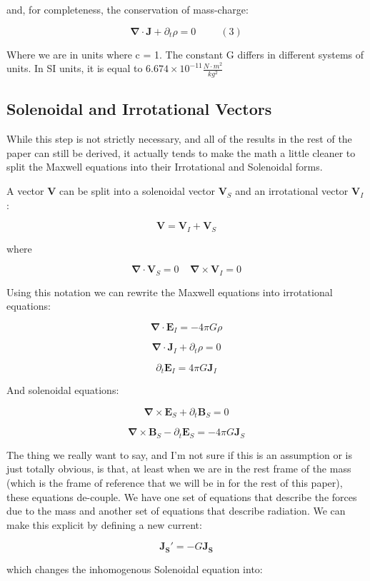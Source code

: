 \documentclass {article}
\renewcommand\vec{\mathbf}
\let\OldS\nabla
\renewcommand{\nabla}{\boldsymbol{\OldS}}
\begin{document}
and, for completeness, the conservation of mass-charge:

$$\nabla \cdot \vec J + \partial_t \rho = 0 ~~~~~~~~~~~ (3)$$

Where we are in units where c = 1. The constant G differs in different systems of units. In SI units, it is equal to $6.674 \times 10^{-11} \frac {N \cdot m^2}{kg^2}$ 

\newpage 
\subsection{Solenoidal and Irrotational Vectors}
While this step is not strictly necessary, and all of the results in the rest of the paper can still be derived, it actually tends to make the math a little cleaner to split the Maxwell equations into their Irrotational and Solenoidal forms.

A vector $\vec V$ can be split into a solenoidal vector $\vec V_S$ and an irrotational vector $\vec V_I$:

$$\vec V = \vec V_I + \vec V_S $$

where

$$\nabla \cdot \vec V_S = 0 ~~~~~ \nabla \times \vec V_I = 0 $$

Using this notation we can rewrite the Maxwell equations into irrotational equations:

$$\nabla \cdot \vec E_I = -4 \pi G  \rho$$

$$\nabla \cdot \vec J_I + \partial_t \rho = 0 $$

$$ \partial_t \vec E_I = 4 \pi G \vec J_I $$

And solenoidal equations:

$$\nabla \times \vec E_S + \partial_t \vec B_S = 0 $$

$$\nabla \times \vec B_S - \partial_t \vec E_S =  - 4 \pi G \vec J_S$$

The thing we really want to say, and I'm not sure if this is an assumption or is just totally obvious, is that, at least when we are in the rest frame of the mass (which is the frame of reference that we will be in for the rest of this paper), these equations de-couple. We have one set of equations that describe the forces due to the mass and another set of equations that describe radiation. We can make this explicit by defining a new current:

$$\vec {J_S'} = - G \vec {J_S}$$

which changes the inhomogenous Solenoidal equation into:
\end{document}
